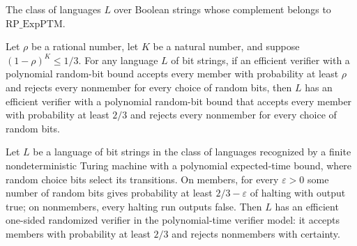 \begin{definition}
\label{Randomized.coRP_ExpPTM}
\leanok
{}
The class of languages $L$ over Boolean strings whose complement belongs to
$\mathrm{RP\_ExpPTM}$.
\end{definition}

\begin{theorem}
\label{Randomized.InRPWith.inRP_of_const}
\leanok
{}
Let $\rho$ be a rational number, let $K$ be a natural number, and suppose $(1-\rho)^K\le
1/3$. For any language $L$ of bit strings, if an efficient verifier with a polynomial
random-bit bound accepts every member with probability at least $\rho$ and rejects every
nonmember for every choice of random bits, then $L$ has an efficient verifier with a
polynomial random-bit bound that accepts every member with probability at least $2/3$
and rejects every nonmember for every choice of random bits.
\end{theorem}

\begin{theorem}
\label{Randomized.inRP_of_mem_RP_ExpPTM}
\leanok
{}
Let $L$ be a language of bit strings in the class of languages recognized by a finite
nondeterministic Turing machine with a polynomial expected-time bound, where random
choice bits select its transitions. On members, for every $\varepsilon>0$ some number of
random bits gives probability at least $2/3-\varepsilon$ of halting with output true; on
nonmembers, every halting run outputs false. Then $L$ has an efficient one-sided
randomized verifier in the polynomial-time verifier model: it accepts members with
probability at least $2/3$ and rejects nonmembers with certainty.
\end{theorem}

